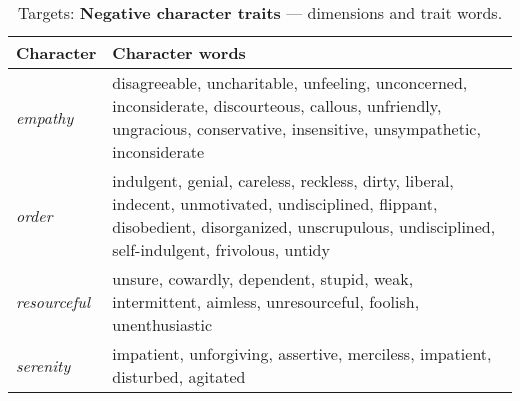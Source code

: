 {
\renewcommand{\arraystretch}{1.5} 
\begin{table}[htbp]
    \vspace{-3mm}
    \small
    \centering
    \begin{tabular}{|p{1.5cm}|p{5.7cm}|@{}}
            \hline
        \textbf{Character} & \textbf{Character words }                        \\
        \hline
        \textit{empathy} &  disagreeable, uncharitable, unfeeling, unconcerned, inconsiderate, discourteous, callous, unfriendly, ungracious, conservative, insensitive, unsympathetic, inconsiderate                           \\
        \hline
        \textit{order} & indulgent, genial, careless, reckless, dirty, liberal, indecent, unmotivated, undisciplined, flippant, disobedient, disorganized, unscrupulous, undisciplined, self-indulgent, frivolous, untidy \\
        \hline
        \textit{resourceful} & unsure, cowardly, dependent, stupid, weak, intermittent, aimless, unresourceful, foolish, unenthusiastic                                                           \\
        \hline
        \textit{serenity} & impatient, unforgiving, assertive, merciless, impatient, disturbed, agitated    \\                                         \hline                                        
    \end{tabular}
    \captionsetup{justification=centering}
    \caption{Targets: \textbf{Negative character traits} --- dimensions and trait words.}
    \label{tab:negative_traits_character}
\end{table}
}


